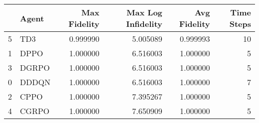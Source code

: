 \begin{tabular}{llrrrr}
\toprule
 & Agent & Max Fidelity & Max Log Infidelity & Avg Fidelity & Time Steps \\
\midrule
5 & TD3 & 0.999990 & 5.005089 & 0.999993 & 10 \\
1 & DPPO & 1.000000 & 6.516003 & 1.000000 & 5 \\
3 & DGRPO & 1.000000 & 6.516003 & 1.000000 & 5 \\
0 & DDDQN & 1.000000 & 6.516003 & 1.000000 & 7 \\
2 & CPPO & 1.000000 & 7.395267 & 1.000000 & 5 \\
4 & CGRPO & 1.000000 & 7.650909 & 1.000000 & 5 \\
\bottomrule
\end{tabular}

